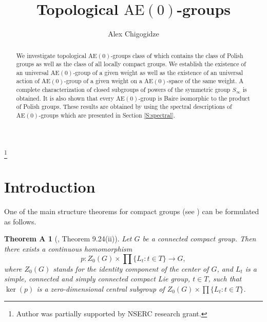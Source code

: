 \documentclass[12pt,draft]{amsart}
\theoremstyle{plain}
\newtheorem*{A}{Theorem A}
\theoremstyle{definition}
\numberwithin{equation}{section}
\begin{document}

\title[Topological $\text{AE}(0)$-groups]{Topological $\text{AE}(0)$-groups}
\author{Alex Chigogidze}
\address{Department of Mathematics and Statistics,
University of Saskatche\-wan,
McLean Hall, 106 Wiggins Road, Saskatoon, SK, S7N 5E6,
Canada}
\thanks{Author was partially supported by NSERC research grant.}




\begin{abstract}{We investigate topological
$\text{AE}(0)$-groups class of which
contains the class of Polish groups as well as the class of
all locally compact groups. We establish the existence
of an universal $\text{AE}(0)$-group of a given weight
as well as the existence of an universal action of
$\text{AE}(0)$-group of a given weight on a $\text{AE}(0)$-space
of the same weight. A complete characterization of closed
subgroups of powers of the symmetric group $S_{\infty}$ is obtained.
It is also shown that every $\text{AE}(0)$-group is Baire
isomorphic to the product of Polish groups. These results
are obtained by using the spectral descriptions of
$\text{AE}(0)$-groups which are presented in Section \ref{S:spectral}.}
\end{abstract}

\maketitle
{}

\section{Introduction}\label{S:intro}

One of the main structure theorems for compact groups
(see \cite[ Chapters 6 \& 9]{hofmor98}) can be formulated as follows.

\begin{A}[\cite{hofmor98}, Theorem 9.24(ii)]\label{T:A}
Let $G$ be a connected compact group. Then there exists
a continuous homomorphism 
\[ p \colon Z_{0}(G) \times \prod\{ L_{t} \colon t \in T\} \to G ,\]
where $Z_{0}(G)$ stands for the identity component of the
center of $G$, and $L_{t}$ is a simple, connected and simply
connected compact Lie group, $t \in T$, such that $\ker (p)$
is a zero-dimensional central subgroup of
$\displaystyle Z_{0}(G) \times \prod\{ L_{t} \colon t \in T\}$.
\end{A}
\end{document}
